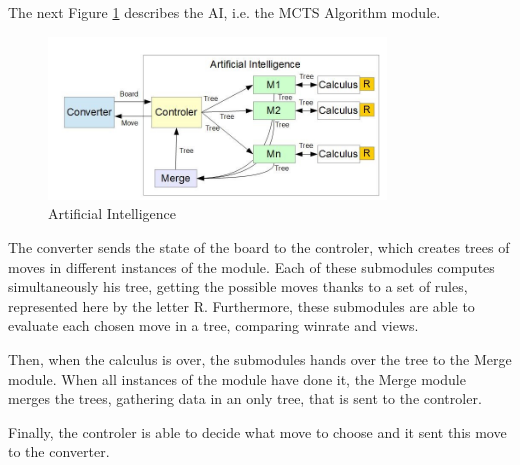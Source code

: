 The next Figure \ref{fig:flow} describes the AI, i.e. the MCTS Algorithm module.

\begin{figure}[H]
	\centering
	\includegraphics[width=0.80\textwidth]{2General_Architecture/2.3MCTS/AI.jpg}
	\caption{Artificial Intelligence}
	\label{fig:flow}
\end{figure}

The converter sends the state of the board to the controler, which creates trees of moves in different instances of the module. Each of these submodules computes simultaneously his tree, getting the possible moves thanks to a set of rules, represented here by the letter R. Furthermore, these submodules are able to evaluate each chosen move in a tree, comparing winrate and views.

Then, when the calculus is over, the submodules hands over the tree to the Merge module. When all instances of the module have done it, the Merge module merges the trees, gathering data in an only tree, that is sent to the controler.

Finally, the controler is able to decide what move to choose and it sent this move to the converter.

